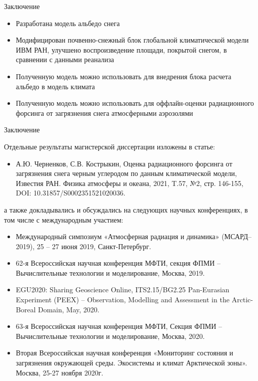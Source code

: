 \documentclass[unicode]{beamer}
\begin{document}
\begin{frame}{Заключение}

\begin{itemize}
    \item Разработана модель альбедо снега
    
    \item Модифицирован почвенно-снежный блок глобальной климатической модели ИВМ РАН, улучшено воспроизведение площади, покрытой снегом, в сравнении с данными реанализа 
    
    \item Полученную модель можно использовать для внедрения блока расчета альбедо в модель климата
    
    \item Полученную модель можно использовать для оффлайн-оценки радиационного форсинга от загрязнения снега атмосферными аэрозолями 
\end{itemize}    
    
\end{frame}



\begin{frame}{Заключение}


\footnotesize
Отдельные результаты магистерской диссертации изложены в статье:
\tiny
\begin{itemize}    
    \item А.Ю. Черненков, С.В. Кострыкин, Оценка радиационного форсинга от загрязнения снега черным углеродом по данным климатической модели, Известия РАН. Физика атмосферы и океана, 2021, T.57, №2, стр. 146-155, DOI: 10.31857/S0002351521020036. 
\end{itemize} 

\footnotesize
а также докладывались и обсуждались на следующих научных конференциях, в том числе с международным участием:
\tiny
\begin{itemize}
    \item Международный симпозиум «Атмосферная радиация и динамика» (МСАРД–2019), 25 – 27 июня 2019, Санкт-Петербург.
    \item 62-я Всероссийская научная конференция МФТИ, секция ФПМИ – Вычислительные технологии и моделирование, Москва, 2019.
    \item EGU2020: Sharing Geoscience Online, ITS2.15/BG2.25 Pan-Eurasian Experiment (PEEX) – Observation, Modelling and Assessment in the Arctic-Boreal Domain, May, 2020.\sloppy 
    \item 63-я Всероссийская научная конференция МФТИ, Секция ФПМИ – Вычислительные технологии и моделирование, Москва, 2020.
    \item Вторая Всероссийская научная конференция «Мониторинг состояния и загрязнения окружающей среды. Экосистемы и климат Арктической зоны». Москва, 25-27 ноября 2020г.
\end{itemize} 
\end{frame}
\end{document}
